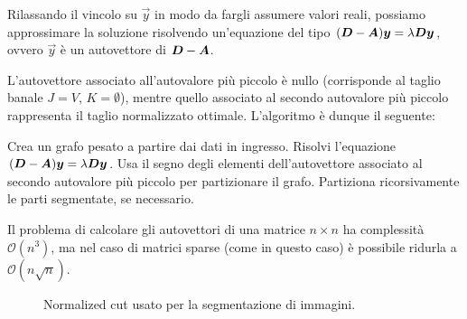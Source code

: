 Rilassando il vincolo su $\vec{y}$ in modo da fargli assumere valori reali, possiamo approssimare la soluzione risolvendo un'equazione del tipo $(\mat{D} - \mat{A}) \vec{y} = \lambda \mat{D} \vec{y}$, ovvero $\vec{y}$ è un autovettore di $\mat{D} - \mat{A}$.

L'autovettore associato all'autovalore più piccolo è nullo (corrisponde al taglio banale $J = V$, $K = \emptyset$), mentre quello associato al secondo autovalore più piccolo rappresenta il taglio normalizzato ottimale. L'algoritmo è dunque il seguente:
\begin{algorithmic}[1]
	\State Crea un grafo pesato a partire dai dati in ingresso.
	\State Risolvi l'equazione $(\mat{D} - \mat{A}) \vec{y} = \lambda \mat{D} \vec{y}$.
	\State Usa il segno degli elementi dell'autovettore associato al secondo autovalore più piccolo per partizionare il grafo.
	\State Partiziona ricorsivamente le parti segmentate, se necessario.
\end{algorithmic}
Il problema di calcolare gli autovettori di una matrice $n \times n$ ha complessità $\mathcal{O}(n^3)$, ma nel caso di matrici sparse (come in questo caso) è possibile ridurla a $\mathcal{O}(n \sqrt{n})$.

\begin{figure}[h!]
	\centering
	\caption{Normalized cut usato per la segmentazione di immagini.}
\end{figure}

